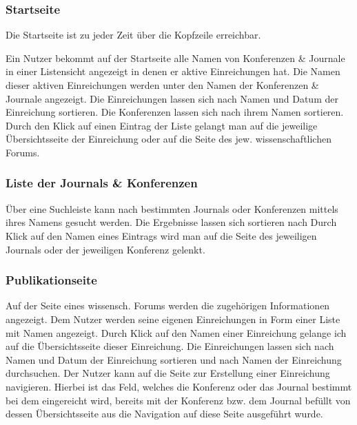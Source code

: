 \subsubsection{Startseite}
\begin{description}
    \XXitem{} Die Startseite ist zu jeder Zeit über die Kopfzeile erreichbar.
    \item
     Ein Nutzer bekommt auf der Startseite alle Namen von Konferenzen
    \& Journale in einer Listensicht angezeigt in denen er aktive Einreichungen hat.
    Die Namen dieser aktiven Einreichungen werden unter den Namen der Konferenzen \& Journale angezeigt.
     Die Einreichungen lassen sich nach Namen und Datum
    der Einreichung sortieren. Die Konferenzen lassen sich nach ihrem Namen sortieren.
    \XXitem{} Durch den Klick auf einen Eintrag der Liste gelangt man auf die jeweilige Übersichtsseite
    der Einreichung oder auf die Seite des jew. wissenschaftlichen Forums.
\end{description}

\subsubsection{Liste der Journals \& Konferenzen}
\begin{description}
     Über eine Suchleiste kann nach bestimmten Journals oder Konferenzen mittels
    ihres Namens gesucht werden.
     Die Ergebnisse lassen sich sortieren nach %
     Durch Klick auf den Namen eines Eintrags wird man auf die Seite des
    jeweiligen Journals oder der jeweiligen Konferenz gelenkt.
\end{description}

\subsubsection{Publikationseite}
\begin{description}
     Auf der Seite eines wissensch. Forums werden die zugehörigen Informationen
    angezeigt. %
     Dem Nutzer werden seine eigenen Einreichungen in Form einer Liste mit Namen angezeigt.
     Durch Klick auf den Namen einer Einreichung gelange ich auf die Übersichtsseite
    dieser Einreichung.
     Die Einreichungen lassen sich nach Namen und Datum
    der Einreichung sortieren und nach Namen der Einreichung durchsuchen. %
    \XXitem{} Der Nutzer kann auf die Seite zur Erstellung einer Einreichung navigieren. Hierbei ist
    das Feld, welches die Konferenz oder das Journal bestimmt bei dem eingereicht wird, bereits mit
    der Konferenz bzw. dem Journal befüllt von dessen Übersichtsseite aus die Navigation auf diese
    Seite ausgeführt wurde.
\end{description}


